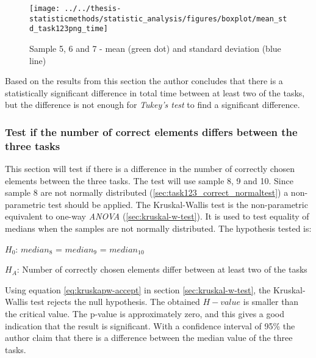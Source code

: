 \begin{figure}[H]
	\centering
	\texttt{[image: ../../thesis-statisticmethods/statistic\_analysis/figures/boxplot/mean\_std\_task123png\_time]}
	\caption{Sample 5, 6 and 7 - mean (green dot) and standard deviation (blue line)}
	\label{fig:meanstdtask123pngtime}
\end{figure}

\vspace{0.3cm}
Based on the results from this section the author concludes that there is a statistically significant difference in total time between at least two of the tasks, but the difference is not enough for \textit{Tukey's test} to find a significant difference. 

\subsubsection[Sample 8, 9, and 10]{Test if the number of correct elements differs between the three tasks}\label{sec:sample_8_9_10_kruskal)} %
This section will test if there is a difference in the number of correctly chosen elements between the three tasks. The test will use sample 8, 9 and 10. Since sample 8 are not normally distributed (\ref{sec:task123_correct_normaltest}) a non-parametric test should be applied. The Kruskal-Wallis test is the non-parametric equivalent to one-way \textit{ANOVA} (\ref{sec:kruskal-w-test}). It is used to test equality of medians when the samples are not normally distributed. The hypothesis tested is: \\[0.2cm]

\centerline{$H_{0}$: $median_8$ = $median_9$ = $median_{10}$}
\centerline{$H_{A}$: Number of correctly chosen elements differ between at least two of the tasks}
\vspace{0.2cm}

Using equation \ref{eq:kruskapw-accept} in section \ref{sec:kruskal-w-test}, the Kruskal-Wallis test rejects the null hypothesis. The obtained $H-value$ is smaller than the critical value. The p-value is approximately zero, and this gives a good indication that the result is significant. With a confidence interval of 95\% the author claim that there is a difference between the median value of the three tasks. \\[0.2cm]

